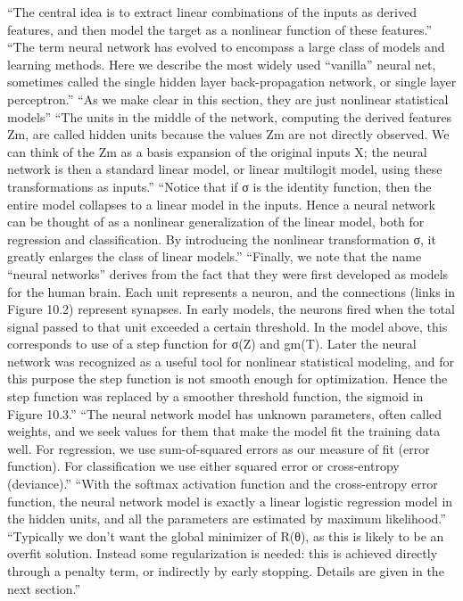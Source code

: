 \documentclass{automatextcc}
\begin{document}
``The central idea is to extract linear combinations of the inputs as derived features, and then model the target as a nonlinear function of these features.''
``The term neural network has evolved to encompass a large class of models and learning methods. Here we describe the most widely used “vanilla” neural net, sometimes called the single hidden layer back-propagation network, or single layer perceptron.''
``As we make clear in this section, they are just nonlinear statistical models''
``The units in the middle of the network, computing the derived features Zm, are called hidden units because the values Zm are not directly observed. We can think of the Zm as a basis expansion of the original inputs X; the neural network is then a standard linear model, or linear multilogit model, using these transformations as inputs.''
``Notice that if σ is the identity function, then the entire model collapses to a linear model in the inputs. Hence a neural network can be thought of as a nonlinear generalization of the linear model, both for regression and classification. By introducing the nonlinear transformation σ, it greatly enlarges the class of linear models.''
``Finally, we note that the name “neural networks” derives from the fact that they were first developed as models for the human brain. Each unit represents a neuron, and the connections (links in Figure 10.2) represent synapses. In early models, the neurons fired when the total signal passed to that unit exceeded a certain threshold. In the model above, this corresponds to use of a step function for σ(Z) and gm(T). Later the neural network was recognized as a useful tool for nonlinear statistical modeling, and for this purpose the step function is not smooth enough for optimization. Hence the step function was replaced by a smoother threshold function, the sigmoid in Figure 10.3.''
``The neural network model has unknown parameters, often called weights,
and we seek values for them that make the model fit the training data well. For regression, we use sum-of-squared errors as our measure of fit (error function). For classification we use either squared error or cross-entropy (deviance).''
``With the softmax activation function and the cross-entropy error function, the neural network model is exactly a linear logistic regression model in the hidden units, and all the parameters are estimated by maximum likelihood.''
``Typically we don’t want the global minimizer of R(θ), as this is likely to be an overfit solution. Instead some regularization is needed: this is achieved directly through a penalty term, or indirectly by early stopping. Details are given in the next section.''
\end{document}
